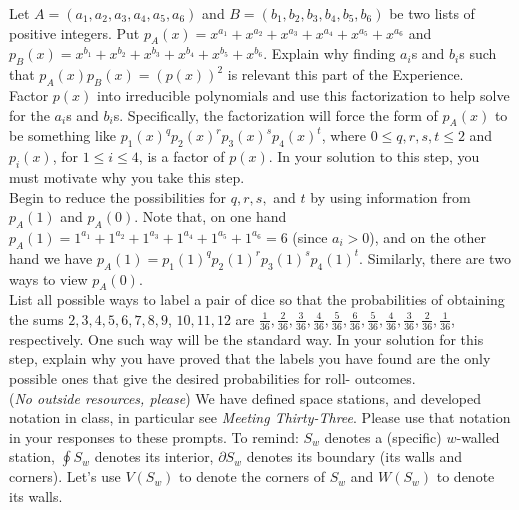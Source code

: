 \documentclass{article}
\begin{document}
  Let $A =(a_1, a_2, a_3, a_4, a_5, a_6)$ and $B = (b_1, b_2, b_3, b_4, b_5, b_6)$ be two lists of positive integers.  Put $p_A(x) = x^{a_1}+x^{a_2} + x^{a_3} + x^{a_4}+x^{a_5} + x^{a_6}$ and $p_B(x) = x^{b_1}+x^{b_2}+x^{b_3}+x^{b_4}+x^{b_5}+x^{b_6}$.  Explain why finding $a_i$s and $b_i$s such that $p_A(x)p_B(x) = (p(x))^2$ is relevant this part of the Experience.\\
  Factor $p(x)$ into irreducible polynomials and use this factorization to help solve for the $a_i$s and $b_i$s. Specifically, the factorization will force the form of $p_A(x)$ to be something like $p_1(x)^qp_2(x)^rp_3(x)^sp_4(x)^t$, where $0 \leq q,r,s,t \leq 2$ and $p_i(x)$, for $1 \leq i \leq 4$, is a factor of $p(x)$.  In your solution to this step, you must motivate why you take this step. \\
 Begin to reduce the possibilities for $q,r,s,$ and $t$ by using information from $p_A(1)$ and $p_A(0)$.  Note that, on one hand $p_A(1) = 1^{a_1} + 1^{a_2} + 1^{a_3} + 1^{a_4} + 1^{a_5}+1^{a_6} = 6$ (since $a_i > 0$), and on the other hand we have $p_A(1) = p_1(1)^qp_2(1)^rp_3(1)^sp_4(1)^t$.  Similarly, there are two ways to view $p_A(0)$.\\
 List all possible ways to label a pair of dice so that the probabilities of obtaining the sums $2, 3, 4, 5, 6, 7, 8, 9$, $10, 11, 12$ are $\frac{1}{36}, \frac{2}{36}, \frac{3}{36}, \frac{4}{36}, \frac{5}{36}, \frac{6}{36}, \frac{5}{36}, \frac{4}{36}, \frac{3}{36}, \frac{2} {36},\frac{1}{36}$, respectively.  One such way will be the standard way.  In your solution for this step, explain why you have proved that the labels you have found are the only possible ones that give the desired probabilities for roll- outcomes.
\vspace{2em}
\noindent \underline{\hspace{5in}}
\vspace{2em}
\\
\noindent(\emph{No outside resources, please}) We have defined space stations, and developed notation in class, in particular see \emph{Meeting Thirty-Three}.  Please use that notation in your responses to these prompts.  To remind: $S_w$ denotes a (specific) $w$-walled station, $\oint S_w$ denotes its interior, $\partial S_w$ denotes its boundary (its walls and corners).  Let's use $V(S_w)$ to denote the corners of $S_w$ and $W(S_w)$ to denote its walls.\\
\end{document}
